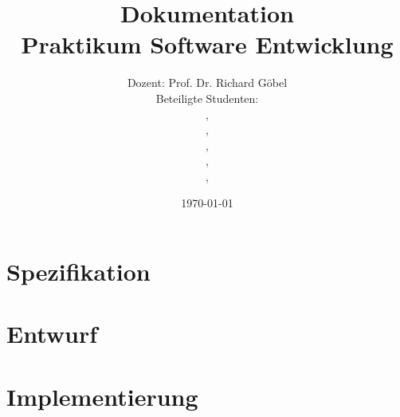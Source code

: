\documentclass[11pt,dvipsnames]{scrreprt}%
\title{Dokumentation\\
Praktikum Software Entwicklung }
\author{Dozent: Prof. Dr. Richard Göbel \\
Beteiligte Studenten: \\
\sab, \\ \flo, \\ \eddy, \\ \ci, \\ \cii, \\ \ciii
}
\date{\today}
\begin{document}
\maketitle

\tableofcontents

\part{Spezifikation}




\part{Entwurf}





\part{Implementierung}


\end{document}
